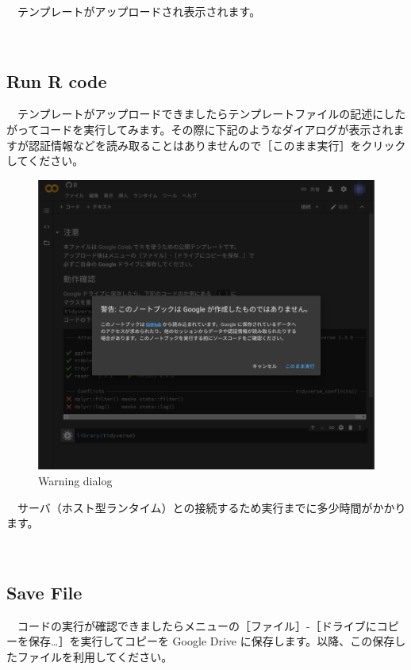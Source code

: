 \documentclass[
  12pt,
]{book}
\begin{document}
　テンプレートがアップロードされ表示されます。

　

\hypertarget{run-r-code}{%
\subsection{Run R code}\label{run-r-code}}

　テンプレートがアップロードできましたらテンプレートファイルの記述にしたがってコードを実行してみます。その際に下記のようなダイアログが表示されますが認証情報などを読み取ることはありませんので［このまま実行］をクリックしてください。

\begin{figure}[H]

{\centering \includegraphics[width=0.8\linewidth,]{fig/Colab/run_dialog} 

}

\caption{Warning dialog}\label{fig:unnamed-chunk-80}
\end{figure}

　サーバ（ホスト型ランタイム）との接続するため実行までに多少時間がかかります。

　

\hypertarget{save-file}{%
\subsection{Save File}\label{save-file}}

　コードの実行が確認できましたらメニューの［ファイル］-［ドライブにコピーを保存\ldots］を実行してコピーを Google Drive に保存します。以降、この保存したファイルを利用してください。

　
\end{document}
